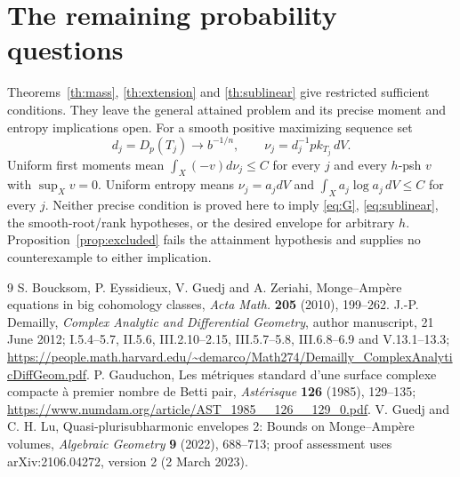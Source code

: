 \documentclass[11pt]{article}
\newcommand{\1}{\mathbf 1}
\theoremstyle{remark}\newtheorem{remark}[theorem]{Remark}
\begin{document}
\section{The remaining probability questions}
Theorems~\ref{th:mass}, \ref{th:extension} and \ref{th:sublinear} give
restricted sufficient conditions. They leave the general attained problem
and its precise moment and entropy implications open.
For a smooth positive maximizing sequence set
\[
 d_j=D_p(T_j)\longrightarrow b^{-1/n},\qquad
 \nu_j=d_j^{-1}p k_{T_j}\,dV.
\]
Uniform first moments mean
$\int_X(-v)d\nu_j\leq C$ for every $j$ and every $h$-psh $v$ with
$\sup_Xv=0$. Uniform entropy means $\nu_j=a_jdV$ and
$\int_Xa_j\log a_j\,dV\leq C$ for every $j$.
Neither precise condition is proved here to imply \eqref{eq:G},
\eqref{eq:sublinear}, the smooth-root/rank hypotheses, or the desired
envelope for arbitrary $h$. Proposition~\ref{prop:excluded} fails the
attainment hypothesis and supplies no counterexample to either implication.

\begin{thebibliography}{9}
 S. Boucksom, P. Eyssidieux, V. Guedj and A. Zeriahi,
Monge--Amp\`ere equations in big cohomology classes,
\emph{Acta Math.} \textbf{205} (2010), 199--262.
 J.-P. Demailly, \emph{Complex Analytic and Differential Geometry},
author manuscript, 21 June 2012;
I.5.4--5.7, II.5.6, III.2.10--2.15, III.5.7--5.8,
III.6.8--6.9 and V.13.1--13.3;
\url{https://people.math.harvard.edu/~demarco/Math274/Demailly_ComplexAnalyticDiffGeom.pdf}.
 P. Gauduchon,
Les m\'etriques standard d'une surface complexe compacte
\`a premier nombre de Betti pair,
\emph{Ast\'erisque} \textbf{126} (1985), 129--135;
\url{https://www.numdam.org/article/AST_1985__126__129_0.pdf}.
 V. Guedj and C. H. Lu,
Quasi-plurisubharmonic envelopes 2: Bounds on Monge--Amp\`ere volumes,
\emph{Algebraic Geometry} \textbf{9} (2022), 688--713;
proof assessment uses arXiv:2106.04272, version 2 (2 March 2023).
\end{thebibliography}
\end{document}
